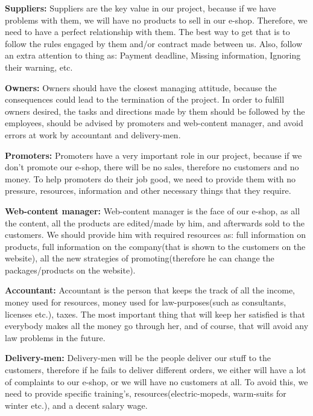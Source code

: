 \documentclass[12p]{article}
\begin{document}
\textbf{Suppliers:}
Suppliers are the key value in our project, because if we have problems with them, we will have no products to sell in our e-shop. Therefore, we need to have a perfect relationship with them. The best way to get that is to follow the rules engaged by them and/or contract made between us. Also, follow an extra attention to thing as: Payment deadline, Missing information, Ignoring their warning, etc.

\textbf{Owners:}
Owners should have the closest managing attitude, because the consequences could lead to the termination of the project. In order to fulfill owners desired, the tasks and directions made by them should be followed by the employees, should be advised by promoters and web-content manager, and avoid errors at work by accountant and delivery-men.

\textbf{Promoters:}
Promoters have a very important role in our project, because if we don't promote our e-shop, there will be no sales, therefore no customers and no money. To help promoters do their job good, we need to provide them with no pressure, resources, information and other necessary things that they require.

\textbf{Web-content manager:}
Web-content manager is the face of our e-shop, as all the content, all the products are edited/made by him, and afterwards sold to the customers. We should provide him with required resources as: full information on products, full information on the company(that is shown to the customers on the website), all the new strategies of promoting(therefore he can change the packages/products on the website).

\textbf{Accountant:}
Accountant is the person that keeps the track of all the income, money used for resources, money used for law-purposes(such as consultants, licenses etc.), taxes. The most important thing that will keep her satisfied is that everybody makes all the money go through her, and of course, that will avoid any law problems in the future.

\textbf{Delivery-men:}
Delivery-men will be the people deliver our stuff to the customers, therefore if he fails to deliver different orders, we either will have a lot of complaints to our e-shop, or we will have no customers at all. To avoid this, we need to provide specific training's, resources(electric-mopeds, warm-suits for winter etc.), and a decent salary wage.

\newpage

\end{document}
